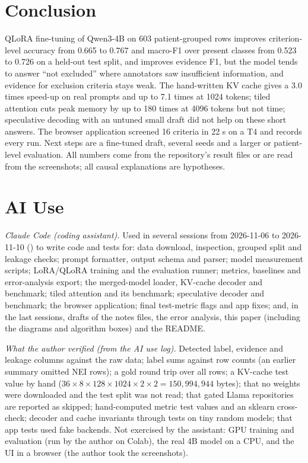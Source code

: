 \documentclass[conference]{IEEEtran}
\begin{document}
\section{Conclusion}
QLoRA fine-tuning of Qwen3-4B on 603 patient-grouped rows improves criterion-level accuracy from 0.665 to 0.767 and macro-F1 over present classes from 0.523 to 0.726 on a held-out test split, and improves evidence F1, but the model tends to answer ``not excluded'' where annotators saw insufficient information, and evidence for exclusion criteria stays weak. The hand-written KV cache gives a 3.0 times speed-up on real prompts and up to 7.1 times at 1024 tokens; tiled attention cuts peak memory by up to 180 times at 4096 tokens but not time; speculative decoding with an untuned small draft did not help on these short answers. The browser application screened 16 criteria in 22 s on a T4 and records every run. Next steps are a fine-tuned draft, several seeds and a larger or patient-level evaluation. All numbers come from the repository's result files or are read from the screenshots; all causal explanations are hypotheses.

\appendices
\section{AI Use}
\emph{Claude Code (coding assistant).} Used in several sessions from 2026-11-06 to 2026-11-10 () to write code and tests for: data download, inspection, grouped split and leakage checks; prompt formatter, output schema and parser; model measurement scripts; LoRA/QLoRA training and the evaluation runner; metrics, baselines and error-analysis export; the merged-model loader, KV-cache decoder and benchmark; tiled attention and its benchmark; speculative decoder and benchmark; the browser application; final test-metric flags and app fixes; and, in the last sessions, drafts of the notes files, the error analysis, this paper (including the diagrams and algorithm boxes) and the README.

\emph{What the author verified (from the AI use log).} Detected label, evidence and leakage columns against the raw data; label sums against row counts (an earlier summary omitted NEI rows); a gold round trip over all rows; a KV-cache test value by hand ($36\times8\times128\times1024\times2\times2=150{,}994{,}944$ bytes); that no weights were downloaded and the test split was not read; that gated Llama repositories are reported as skipped; hand-computed metric test values and an sklearn cross-check; decoder and cache invariants through tests on tiny random models; that app tests used fake backends. Not exercised by the assistant: GPU training and evaluation (run by the author on Colab), the real 4B model on a CPU, and the UI in a browser (the author took the screenshots). %
\end{document}
